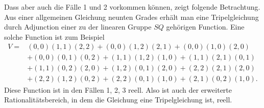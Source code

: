 \documentclass[11pt]{article}
\begin{document}
Dass aber auch die Fälle 1 und 2 vorkommen können, zeigt folgende Betrachtung. Aus einer allgemeinen Gleichung neunten Grades erhält man eine Tripelgleichung durch Adjunction einer zu der linearen Gruppe \(SQ\) gehörigen Function. Eine solche Function ist zum Beispiel
\begin{align*}
 V={}&(0,0)(1,1)(2,2)+(0,0)(1,2)(2,1)+(0,0)(1,0)(2,0)\\
 &+(0,0)(0,1)(0,2)+(1,1)(1,2)(1,0)+(1,1)(2,1)(0,1)\\
 &+(1,1)(0,2)(2,0)+(1,2)(0,1)(2,0)+(2,2)(2,1)(2,0)\\
 &+(2,2)(1,2)(0,2)+(2,2)(0,1)(1,0)+(2,1)(0,2)(1,0).
\end{align*}
Diese Function ist in den Fällen 1, 2, 3 reell. Also ist auch der erweiterte Rationalitätsbereich, in dem die Gleichung eine Tripelgleichung ist, reell.
\end{document}
